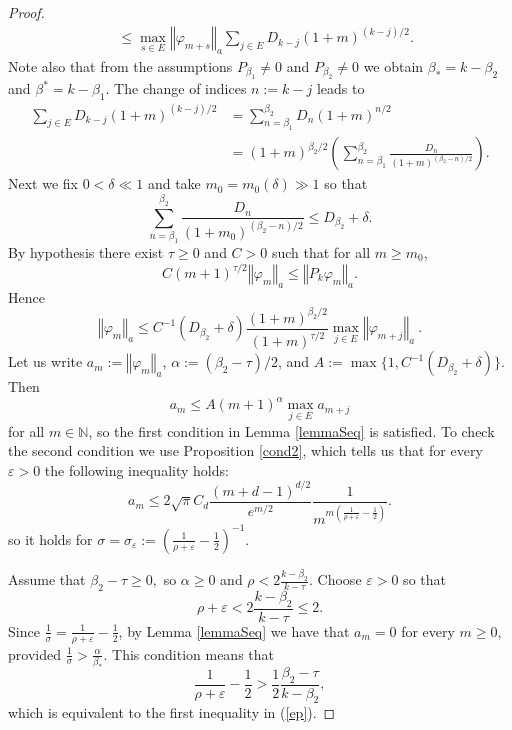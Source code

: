 \documentclass[12pt]{amsart}
\begin{document}
\begin{proof}
\begin{align*}
		&  \leq\max_{s\in E}\left\Vert \varphi_{m+s}\right\Vert _{a}\sum_{j\in
			E}D_{k-j}\left(  1+m\right)  ^{\left(  k-j\right)  /2}.
	\end{align*}
	Note also that from the assumptions
	$P_{\beta_{1}} \ne 0$ and 
	$P_{\beta_{2}} \ne 0$ we obtain $\beta_* = k - \beta_2$ and  $\beta^* = k - \beta_1$.
	The change of indices $n:=k-j$ leads to
	\begin{align*}
		\sum_{j\in E}D_{k-j}\left(  1+m\right)  ^{\left(  k-j\right)  /2} &
		=\sum_{n= \beta_1 }^{\beta_{2}}D_{n}\left(  1+m\right)  ^{n/2}\\
		&  = \left(  1+m\right)  ^{\beta_{2}/2}\left(  \sum_{n= \beta_1 }^{\beta_{2}}
		\frac{D_{n}}{\left(  1+m\right)^{\left(  \beta_{2}-n\right) /2}}\right).
	\end{align*}
	Next we fix $0<\delta\ll1$ and take $m_{0}=m_{0}(\delta)\gg1$ so that
	\[
	\sum_{n = \beta_1 }^{\beta_{2}}\frac{D_{n}}{\left(  1+m_{0}\right)^{\left(  \beta
			_{2}- n \right)  /2}}\leq D_{\beta_{2}}+\delta.
	\]
	By hypothesis there exist $\tau\geq0$ and $C>0$ such that for all $m \ge m_0$,
	\[
	C\left(  m+1\right)  ^{\tau/2}\left\Vert \varphi_{m}\right\Vert_a \leq\left\Vert
	P_{k}\varphi_{m}\right\Vert _{a}.
	\]
	Hence
	\[
	\left\Vert \varphi_{m}\right\Vert _{a}\leq C^{-1}\left(  D_{\beta_{2}}%
	+\delta\right)  \frac{\left(  1+m\right)  ^{\beta_{2}/2}}{\left(  1+m\right)
		^{\tau/2}}\max_{j\in E}\left\Vert \varphi_{m+j}\right\Vert _{a}\ .
	\]
	Let us write $a_{m}:=\left\Vert \varphi_{m}\right\Vert _{a}$, $\alpha:=\left(
	\beta_{2}-\tau\right)  /2$,  and $A:= \max\{1,  C^{-1}\left(  D_{\beta_{2}}%
	+\delta\right)\}  $. Then
	\[
	a_{m}\leq A\left(  m+1\right)  ^{\alpha}\max_{j\in E}a_{m+j}%
	\]
	for all $m\in\mathbb{N}$, so the first condition in Lemma \ref{lemmaSeq} is
	satisfied. To check the second condition we use Proposition \ref{cond2}, which
	tells us that for every $\varepsilon>0$ the following inequality holds:
	\[
	a_{m}\leq2\sqrt{\pi}C_{d}\frac{\left(  m+d-1\right)  ^{d/2}}{e^{m/2}}\frac
	{1}{m^{m\left(  \frac{1}{\rho+\varepsilon}-\frac{1}{2}\right)  }}.
	\]
	so it holds for $\sigma=\sigma_{\varepsilon}:= (\frac{1}{\rho+\varepsilon}
	-\frac{1}{2})^{-1}.$  
	
	Assume that $\beta_{2}-\tau\geq0,$ so $\alpha\geq0$ and $\rho<2\frac{k-\beta_2
	}{k-\tau}.$ Choose $\varepsilon>0$ so that
	\begin{equation}\label{ep}
		\rho+\varepsilon<2\frac{k-\beta_2}{k-\tau}
		\le 2.
	\end{equation}
	Since $\frac{1}{\sigma}=\frac{1}{\rho+\varepsilon}-\frac{1}{2}$, 
	by Lemma \ref{lemmaSeq} we have that $a_{m} = 0$ for every $m \ge 0$, provided $\frac{1}%
	{\sigma}>\frac{\alpha}{\beta_{\ast}}.$ This condition means that
	\[
	\frac{1}{\rho+\varepsilon}-\frac{1}{2}
	>
	\frac{1}{2}\frac{\beta_2-\tau}{k-\beta_2},
	\] 
	which is equivalent to the first inequality in (\ref{ep}).
	

\end{proof}
\end{document}
